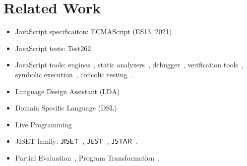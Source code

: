 \section{Related Work}\label{sec:related}

\begin{itemize}
  \item JavaScript specificaiton: ECMAScript (ES13, 2021)~\cite{es13}
  \item JavaScript tests: Test262~\cite{test262}
  \item JavaScript tools: engines~\cite{v8, jscore, chakra, spidermonkey},
    static analyzers~\cite{safe, safe2, tajs, wala, jsai},
    debugger~\cite{jsexplain}, verification tools~\cite{javert, javert2,
    ad-safety, javanni}, symbolic execution~\cite{symbolic-js, sym-js, expo-se},
    concolic testing~\cite{jalangi, type-conc-test}.
  \item Language Design Assistant (LDA)~\cite{lda, lisa, ipld, asf-sdf,
    meta-env, faustine}
  \item Domain Specific Language (DSL)~\cite{dsl-survey, dsl-survey2}
  \item Live Programming~\cite{omnicode, situ-vis, proj-box}
  \item JISET family: $\jiset$~\cite{jiset}, $\jest$~\cite{jest}, $\jstar$~\cite{jstar}.
  \item Partial Evaluation~\cite{peval, peval-survey}, Program
    Transformation~\cite{trans-ai}.
\end{itemize}

\todo
